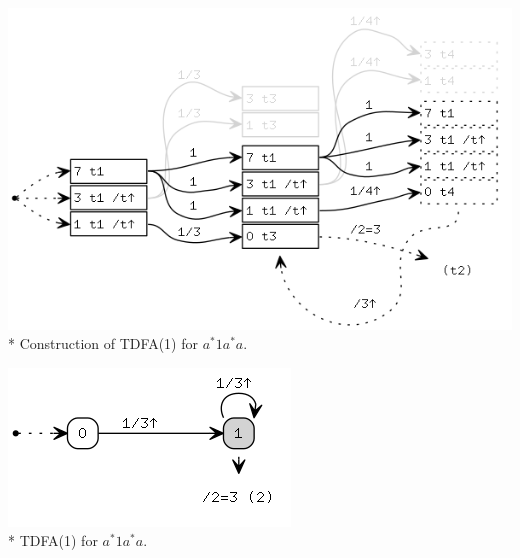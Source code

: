 \documentclass{article}
\theoremstyle{definition}
\begin{document}
\begin{multicols}{2}
\begin{center}
\includegraphics[width=0.8\linewidth]{img/example2/tdfa1_raw.png}\\*
\footnotesize{Construction of TDFA(1) for $a^* 1 a^* a$.} \\
\end{center}
\begin{center}
\includegraphics[width=0.5\linewidth]{img/example2/tdfa1.png}\\*
\footnotesize{TDFA(1) for $a^* 1 a^* a$.} \\
\end{center}


\end{multicols}
\end{document}
